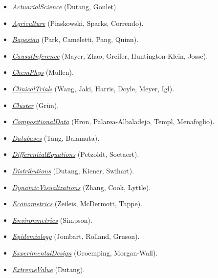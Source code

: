 \begin{itemize}
\tightlist
\item
  \href{https://CRAN.R-project.org/view=ActuarialScience}{\emph{ActuarialScience}} (Dutang, Goulet).
\item
  \href{https://CRAN.R-project.org/view=Agriculture}{\emph{Agriculture}} (Piaskowski, Sparks, Correndo).
\item
  \href{https://CRAN.R-project.org/view=Bayesian}{\emph{Bayesian}} (Park, Cameletti, Pang, Quinn).
\item
  \href{https://CRAN.R-project.org/view=CausalInference}{\emph{CausalInference}} (Mayer, Zhao, Greifer, Huntington-Klein, Josse).
\item
  \href{https://CRAN.R-project.org/view=ChemPhys}{\emph{ChemPhys}} (Mullen).
\item
  \href{https://CRAN.R-project.org/view=ClinicalTrials}{\emph{ClinicalTrials}} (Wang, Jaki, Harris, Doyle, Meyer, Igl).
\item
  \href{https://CRAN.R-project.org/view=Cluster}{\emph{Cluster}} (Grün).
\item
  \href{https://CRAN.R-project.org/view=CompositionalData}{\emph{CompositionalData}} (Hron, Palarea-Albaladejo, Templ, Menafoglio).
\item
  \href{https://CRAN.R-project.org/view=Databases}{\emph{Databases}} (Tang, Balamuta).
\item
  \href{https://CRAN.R-project.org/view=DifferentialEquations}{\emph{DifferentialEquations}} (Petzoldt, Soetaert).
\item
  \href{https://CRAN.R-project.org/view=Distributions}{\emph{Distributions}} (Dutang, Kiener, Swihart).
\item
  \href{https://CRAN.R-project.org/view=DynamicVisualizations}{\emph{DynamicVisualizations}} (Zhang, Cook, Lyttle).
\item
  \href{https://CRAN.R-project.org/view=Econometrics}{\emph{Econometrics}} (Zeileis, McDermott, Tappe).
\item
  \href{https://CRAN.R-project.org/view=Environmetrics}{\emph{Environmetrics}} (Simpson).
\item
  \href{https://CRAN.R-project.org/view=Epidemiology}{\emph{Epidemiology}} (Jombart, Rolland, Gruson).
\item
  \href{https://CRAN.R-project.org/view=ExperimentalDesign}{\emph{ExperimentalDesign}} (Groemping, Morgan-Wall).
\item
  \href{https://CRAN.R-project.org/view=ExtremeValue}{\emph{ExtremeValue}} (Dutang).

\end{itemize}
